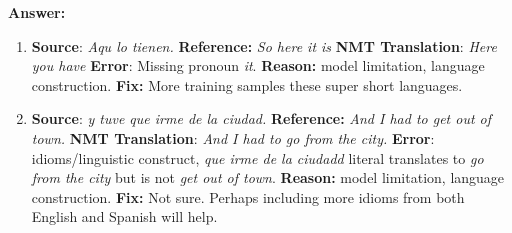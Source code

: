 \documentclass{article}
\begin{document}
\noindent
\textbf{Answer:}
\begin{enumerate}[i]
    \item \textbf{Source}: \textit{Aqu lo tienen.} \newline \textbf{Reference:} \textit{So here it is} \newline \textbf{NMT Translation}: \textit{Here you have} \newline \textbf{Error}: Missing pronoun \textit{it}. \newline \textbf{Reason:} model limitation, language construction. \newline \textbf{Fix:} More training samples these super short languages.
    \item \textbf{Source}: \textit{y tuve que irme de la ciudad.} \newline \textbf{Reference:} \textit{And I had to get out of town.} \newline \textbf{NMT Translation}: \textit{And I had to go from the city.} \newline \textbf{Error}: idioms/linguistic construct, \textit{que irme de la ciudadd} literal translates to \textit{go from the city} but is not \textit{get out of town}. \newline \textbf{Reason:} model limitation, language construction. \newline \textbf{Fix:} Not sure. Perhaps including more idioms from both English and Spanish will help.
\end{enumerate}
\end{document}
